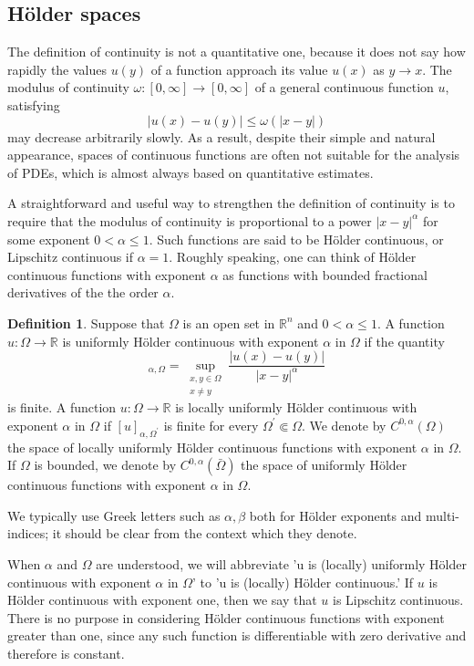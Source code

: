 \documentclass[10pt]{article}
\theoremstyle{plain}
\theoremstyle{definition}
\newtheorem{definition}[theorem]{Definition}
\theoremstyle{remark}
\begin{document}
\subsection{Hölder spaces}
The definition of continuity is not a quantitative one, because it does not say how rapidly the values $u(y)$ of a function approach its value $u(x)$ as $y \rightarrow x$. The modulus of continuity $\omega:[0, \infty] \rightarrow[0, \infty]$ of a general continuous function $u$, satisfying
$$
|u(x)-u(y)| \leq \omega(|x-y|)
$$
may decrease arbitrarily slowly. As a result, despite their simple and natural appearance, spaces of continuous functions are often not suitable for the analysis of PDEs, which is almost always based on quantitative estimates.

A straightforward and useful way to strengthen the definition of continuity is to require that the modulus of continuity is proportional to a power $|x-y|^{\alpha}$ for some exponent $0<\alpha \leq 1$. Such functions are said to be Hölder continuous, or Lipschitz continuous if $\alpha=1$. Roughly speaking, one can think of Hölder continuous functions with exponent $\alpha$ as functions with bounded fractional derivatives of the the order $\alpha$.

\begin{definition}
Suppose that $\Omega$ is an open set in $\mathbb{R}^{n}$ and $0<\alpha \leq 1$. A function $u: \Omega \rightarrow \mathbb{R}$ is uniformly Hölder continuous with exponent $\alpha$ in $\Omega$ if the quantity
\begin{equation}
[u]_{\alpha, \Omega}=\sup_{\substack{x, y \in \Omega \\ x \neq y}} \frac{|u(x)-u(y)|}{|x-y|^{\alpha}}
\end{equation}
is finite. A function $u: \Omega \rightarrow \mathbb{R}$ is locally uniformly Hölder continuous with exponent $\alpha$ in $\Omega$ if $[u]_{\alpha, \Omega^{\prime}}$ is finite for every $\Omega^{\prime} \Subset \Omega$. We denote by $C^{0, \alpha}(\Omega)$ the space of locally uniformly Hölder continuous functions with exponent $\alpha$ in $\Omega$. If $\Omega$ is bounded, we denote by $C^{0, \alpha}(\bar{\Omega})$ the space of uniformly Hölder continuous functions with exponent $\alpha$ in $\Omega$.
\end{definition}

We typically use Greek letters such as $\alpha, \beta$ both for Hölder exponents and multi-indices; it should be clear from the context which they denote.

When $\alpha$ and $\Omega$ are understood, we will abbreviate 'u is (locally) uniformly Hölder continuous with exponent $\alpha$ in $\Omega$' to 'u is (locally) Hölder continuous.' If $u$ is Hölder continuous with exponent one, then we say that $u$ is Lipschitz continuous. There is no purpose in considering Hölder continuous functions with exponent greater than one, since any such function is differentiable with zero derivative and therefore is constant.
\end{document}
